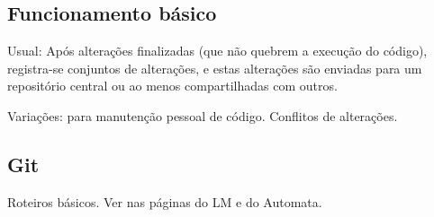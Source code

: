 \subsection{Funcionamento básico}

Usual: Após alterações finalizadas (que não quebrem a execução do código), registra-se conjuntos de alterações, e estas alterações são
enviadas para um repositório central ou ao menos compartilhadas com outros.

Variações: para manutenção pessoal de código. Conflitos de alterações.

\subsection{Git}

Roteiros básicos. Ver nas páginas do LM e do Automata.